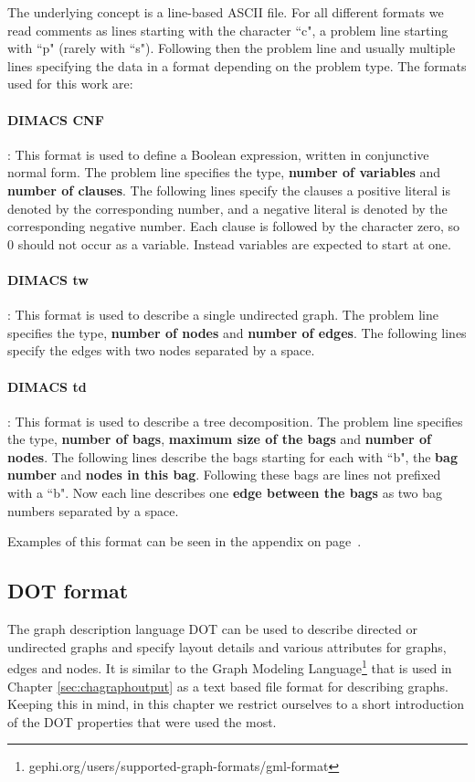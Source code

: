 \documentclass[a4paper, 12pt, bibliography=totoc]{scrartcl}
\begin{document}
The underlying concept is a line-based ASCII file. For all different formats we read comments as lines starting with the character ``c", a problem line starting with ``p" (rarely with ``s"). Following then the problem line and usually multiple lines specifying the data in a format depending on the problem type.
The formats used for this work are:

\paragraph{DIMACS CNF}: This format is used to define a Boolean expression, written in conjunctive normal form. The problem line specifies the type, \textbf{number of variables} and \textbf{number of clauses}. The following lines specify the clauses a positive literal is denoted by the corresponding number, and a negative literal is denoted by the corresponding negative number. Each clause is followed by the character zero, so 0 should not occur as a variable. Instead variables are expected to start at one.

\paragraph{DIMACS tw}: This format is used to describe a single undirected graph. The problem line specifies the type, \textbf{number of nodes} and \textbf{number of edges}. The following lines specify the edges with two nodes separated by a space.

\paragraph{DIMACS td}: This format is used to describe a tree decomposition. The problem line specifies the type, \textbf{number of bags}, \textbf{maximum size of the bags} and \textbf{number of nodes}. The following lines describe the bags starting for each with ``b", the \textbf{bag number} and \textbf{nodes in this bag}. Following these bags are lines not prefixed with a ``b". Now each line describes one \textbf{edge between the bags} as two bag numbers separated by a space.

\noindent
Examples of this format can be seen in the appendix on page~\pageref{app:input}.

\subsection{DOT format}
The graph description language DOT can be used to describe directed or undirected graphs and specify layout details and various attributes for graphs, edges and nodes. It is similar to the Graph Modeling Language\footnote{gephi.org/users/supported-graph-formats/gml-format} that is used in Chapter \ref{sec:chagraphoutput} as a text based file format for describing graphs. Keeping this in mind, in this chapter we restrict ourselves to a short introduction of the DOT properties that were used the most.
\end{document}
